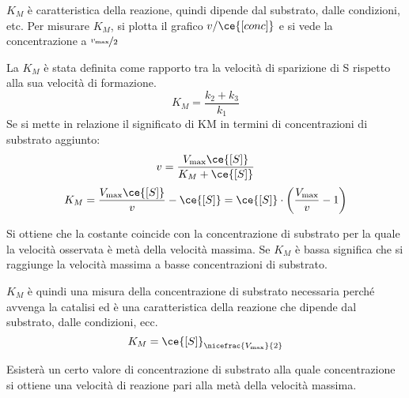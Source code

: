 $K_M$ è caratteristica della reazione, quindi dipende dal substrato, dalle condizioni, etc.
Per misurare $K_M$, si plotta il grafico $v/\ce{[conc]}$ e si vede la concentrazione a $\nicefrac{v_{\text{max}}}{2}$



La $K_M$ è stata definita come rapporto tra la velocità di sparizione di S rispetto alla sua
velocità di formazione.
\[
K_M = \frac{k_2 + k_3}{k_1}
\]
Se si mette in relazione il significato di KM in termini di concentrazioni di substrato
aggiunto:
\[
v = \frac{V_{\text{max}} \ce{[S]}}{K_M + \ce{[S]}}
\]
\[
K_M = \frac{V_{\text{max}} \ce{[S]}}{v} - \ce{[S]} = \ce{[S]} \cdot \biggl(\frac{V_{\text{max}}}{v} - 1\biggr)
\]

Si ottiene che la costante coincide con la concentrazione di substrato per la quale la
velocità osservata è metà della velocità massima.
Se $K_M$ è bassa significa che si raggiunge la velocità massima a basse concentrazioni di substrato.

$K_M$ è quindi una misura della concentrazione di substrato necessaria perché avvenga la catalisi ed è una caratteristica della reazione che dipende dal substrato,
dalle condizioni, ecc.
\[
K_M = \ce{[S]}_{\nicefrac{V_{\text{max}}}{2}}
\]

Esisterà un certo valore di concentrazione di substrato alla quale concentrazione
si ottiene una velocità di reazione pari alla metà della velocità massima.

